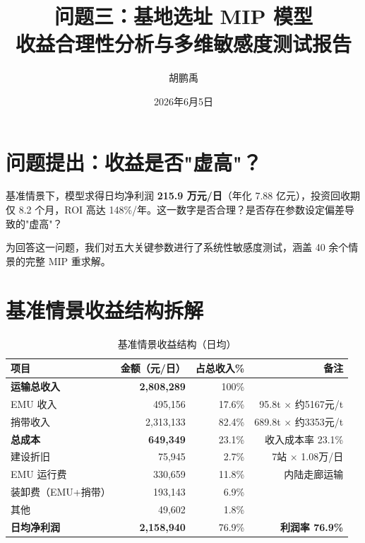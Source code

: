 \documentclass[12pt,a4paper,fontset=none]{ctexart}
\begin{document}
\title{\heiti{} 问题三：基地选址 MIP 模型\\[6pt]
       \large 收益合理性分析与多维敏感度测试报告}
\author{\kaishu{} 胡鹏禹}
\date{ 2026年6月5日}
\maketitle
\thispagestyle{empty}

\section{问题提出：收益是否"虚高"？}

基准情景下，模型求得日均净利润 \textbf{215.9 万元/日}（年化 7.88 亿元），投资回收期仅 8.2 个月，ROI 高达 148\%/年。这一数字是否合理？是否存在参数设定偏差导致的"虚高"？

为回答这一问题，我们对五大关键参数进行了系统性敏感度测试，涵盖 40 余个情景的完整 MIP 重求解。

\section{基准情景收益结构拆解}

\begin{table}[H]
\centering\small
\caption{基准情景收益结构（日均）}
\begin{tabular}{lrrr}
\toprule
项目 & 金额（元/日） & 占总收入\% & 备注 \\
\midrule
\rowcolor{blue!8}
\textbf{运输总收入} & \textbf{2,808,289} & 100\% & \\
\quad EMU 收入 & 495,156 & 17.6\% & 95.8t $\times$ 约5167元/t \\
\quad 捎带收入 & 2,313,133 & 82.4\% & 689.8t $\times$ 约3353元/t \\
\midrule
\rowcolor{red!8}
\textbf{总成本} & \textbf{649,349} & 23.1\% & 收入成本率 23.1\% \\
\quad 建设折旧 & 75,945 & 2.7\% & 7站 $\times$ 1.08万/日 \\
\quad EMU 运行费 & 330,659 & 11.8\% & 内陆走廊运输 \\
\quad 装卸费（EMU+捎带） & 193,143 & 6.9\% & \\
\quad 其他 & 49,602 & 1.8\% & \\
\midrule
\rowcolor{green!8}
\textbf{日均净利润} & \textbf{2,158,940} & 76.9\% & \textbf{利润率 76.9\%} \\
\bottomrule
\end{tabular}
\end{table}
\end{document}
